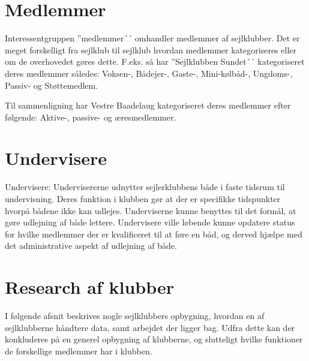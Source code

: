 \section{Medlemmer}

Interessentgruppen ''medlemmer´´ omhandler medlemmer af sejlklubber. Det er meget forskelligt fra sejlklub til
sejlklub hvordan medlemmer kategoriseres eller om de overhovedet gøres dette. F.eks. så har ''Sejlklubben
Sundet´´ kategoriseret deres medlemmer således: Voksen-, Bådejer-, Gaste-, Mini-kølbåd-, Ungdoms-, Passiv- og
Støttemedlem.

Til sammenligning har Vestre Baadelaug kategoriseret deres medlemmer efter følgende: Aktive-, passive- og
æresmedlemmer.




\section{Undervisere}

Undervisere: Undervisererne udnytter sejlerklubbens både i faste tidsrum til undervisning. Deres funktion i
klubben gør at der er specifikke tidspunkter hvorpå bådene ikke kan udlejes. Underviserne kunne benyttes til
det formål, at gøre udlejning af både lettere. Undervisere ville løbende kunne opdatere status for hvilke
medlemmer der er kvalificeret til at føre en båd, og derved hjælpe med det administrative aspekt af udlejning
af både.

\cbstart
\section{Research af klubber}\label{sec:research}

I følgende afsnit beskrives nogle sejlklubbers opbygning, hvordan en af sejlklubberne håndtere data, samt arbejdet der
ligger bag. Udfra dette kan der konkluderes på en generel opbygning af klubberne, og slutteligt hvilke funktioner de
forskellige medlemmer har i klubben.

